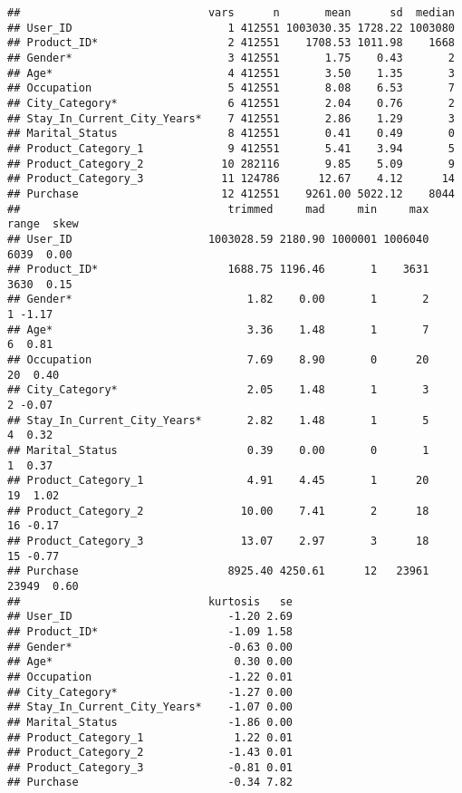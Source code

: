 \documentclass[]{article}
\begin{document}
\begin{verbatim}
##                             vars      n       mean      sd  median
## User_ID                        1 412551 1003030.35 1728.22 1003080
## Product_ID*                    2 412551    1708.53 1011.98    1668
## Gender*                        3 412551       1.75    0.43       2
## Age*                           4 412551       3.50    1.35       3
## Occupation                     5 412551       8.08    6.53       7
## City_Category*                 6 412551       2.04    0.76       2
## Stay_In_Current_City_Years*    7 412551       2.86    1.29       3
## Marital_Status                 8 412551       0.41    0.49       0
## Product_Category_1             9 412551       5.41    3.94       5
## Product_Category_2            10 282116       9.85    5.09       9
## Product_Category_3            11 124786      12.67    4.12      14
## Purchase                      12 412551    9261.00 5022.12    8044
##                                trimmed     mad     min     max range  skew
## User_ID                     1003028.59 2180.90 1000001 1006040  6039  0.00
## Product_ID*                    1688.75 1196.46       1    3631  3630  0.15
## Gender*                           1.82    0.00       1       2     1 -1.17
## Age*                              3.36    1.48       1       7     6  0.81
## Occupation                        7.69    8.90       0      20    20  0.40
## City_Category*                    2.05    1.48       1       3     2 -0.07
## Stay_In_Current_City_Years*       2.82    1.48       1       5     4  0.32
## Marital_Status                    0.39    0.00       0       1     1  0.37
## Product_Category_1                4.91    4.45       1      20    19  1.02
## Product_Category_2               10.00    7.41       2      18    16 -0.17
## Product_Category_3               13.07    2.97       3      18    15 -0.77
## Purchase                       8925.40 4250.61      12   23961 23949  0.60
##                             kurtosis   se
## User_ID                        -1.20 2.69
## Product_ID*                    -1.09 1.58
## Gender*                        -0.63 0.00
## Age*                            0.30 0.00
## Occupation                     -1.22 0.01
## City_Category*                 -1.27 0.00
## Stay_In_Current_City_Years*    -1.07 0.00
## Marital_Status                 -1.86 0.00
## Product_Category_1              1.22 0.01
## Product_Category_2             -1.43 0.01
## Product_Category_3             -0.81 0.01
## Purchase                       -0.34 7.82
\end{verbatim}
\end{document}
